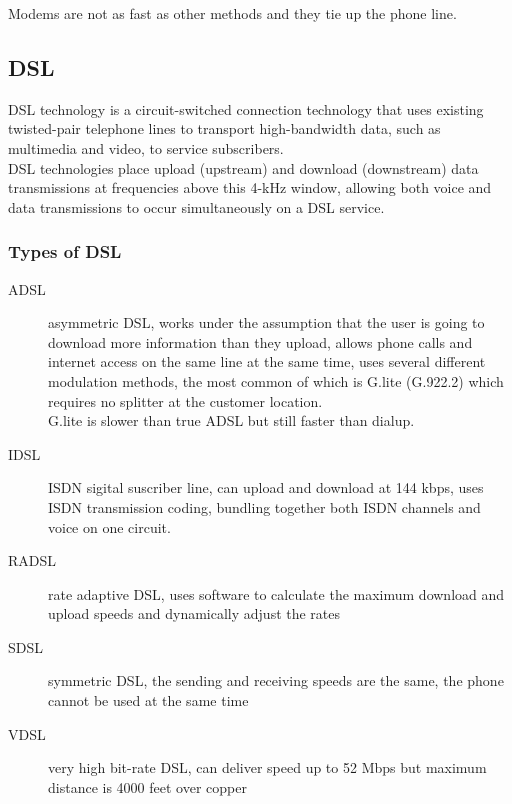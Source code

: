 Modems are not as fast as other methods and they tie up the phone line.

\subsection{DSL}

DSL technology is a circuit-switched connection technology that uses existing
twisted-pair telephone lines to transport high-bandwidth data, such as
multimedia and video, to service subscribers.\\

DSL technologies place upload (upstream) and download (downstream) data
transmissions at frequencies above this 4-kHz window, allowing both voice and
data transmissions to occur simultaneously on a DSL service.

\subsubsection{Types of DSL}

\begin{description}

\item[ADSL]
asymmetric DSL, works under the assumption that the user is going to download
more information than they upload, allows phone calls and internet access on
the same line at the same time, uses several different modulation methods, the
most common of which is G.lite (G.922.2) which requires no splitter at the
customer location.\\

G.lite is slower than true ADSL but still faster than dialup.

\item[IDSL]
ISDN sigital suscriber line, can upload and download at 144 kbps, uses ISDN
transmission coding, bundling together both ISDN channels and voice on one
circuit. 

\item[RADSL]
rate adaptive DSL, uses software to calculate the maximum download and upload
speeds and dynamically adjust the rates

\item[SDSL]
symmetric DSL, the sending and receiving speeds are the same, the phone cannot
be used at the same time

\item[VDSL]
very high bit-rate DSL, can deliver speed up to 52 Mbps but maximum distance is
4000 feet over copper

\end{description}

